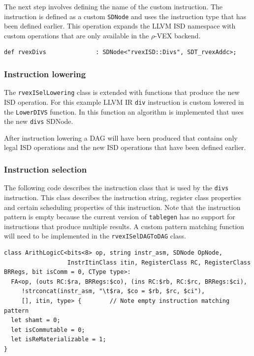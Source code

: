 The next step involves defining the name of the custom instruction. The instruction is defined as a custom \texttt{SDNode} and uses the instruction type that has been defined earlier. This operation expands the LLVM ISD namespace with custom operations that are only available in the $\rho$-VEX backend.

\begin{lstlisting}[language=tblgen]
def rvexDivs              : SDNode<"rvexISD::Divs", SDT_rvexAddc>;
\end{lstlisting}

\subsubsection{Instruction lowering}
The \texttt{rvexISelLowering} class is extended with functions that produce the new ISD operation. For this example LLVM IR \texttt{div} instruction is custom lowered in the \texttt{LowerDIVS} function. In this function an algorithm is implemented that uses the new \texttt{divs} SDNode.

After instruction lowering a DAG will have been produced that contains only legal ISD operations and the new ISD operations that have been defined earlier.

\newpage

\subsubsection{Instruction selection}
The following code describes the instruction class that is used by the \texttt{divs} instruction. This class describes the instruction string, register class properties and certain scheduling properties of this instruction. Note that the instruction pattern is empty because the current version of \texttt{tablegen} has no support for instructions that produce multiple results. A custom pattern matching function will need to be implemented in the \texttt{rvexISelDAGToDAG} class.

\begin{lstlisting}[language=tblgen]
class ArithLogicC<bits<8> op, string instr_asm, SDNode OpNode,
                  InstrItinClass itin, RegisterClass RC, RegisterClass BRRegs, bit isComm = 0, CType type>:
  FA<op, (outs RC:$ra, BRRegs:$co), (ins RC:$rb, RC:$rc, BRRegs:$ci),
     !strconcat(instr_asm, "\t$ra, $co = $rb, $rc, $ci"),
     [], itin, type> {        // Note empty instruction matching pattern
  let shamt = 0;
  let isCommutable = 0;
  let isReMaterializable = 1;
}
\end{lstlisting}

